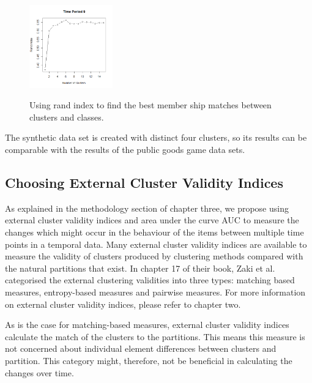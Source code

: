 \begin{figure}[!h]
{\begin{minipage}{\dimexpr \textwidth-2\fboxsep-2\fboxrule}
{                     \includegraphics[width=0.32\textwidth]{images/chapter4/elbowMemberShipAgreement9.png}    
                 }\\
             \end{minipage}}
             \caption{Using rand index to find the best member ship matches between clusters and classes.}
             \label{fig:elbowMemberShipAgreement}
         \end{figure}
         
 The synthetic data set is created with distinct four clusters, so its results can be comparable with the results of the public goods game data sets.
         
\subsection{Choosing External Cluster Validity Indices}
\label{sec:ChoosingExternalClusterValidityIndices}
         
As explained in the methodology section of chapter three, we propose using external cluster validity indices and area under the curve AUC to measure the changes which might occur in the behaviour of the items between multiple time points in a temporal data. Many external cluster validity indices are available \cite{Arbelaitz2012} to measure the validity of clusters produced by clustering methods compared with the natural partitions that exist. In chapter 17 of their book, Zaki et al. \cite{Zaki2014} categorised the external clustering validities into three types: matching based measures, entropy-based measures and pairwise measures. For more information on external cluster validity indices, please refer to chapter two.
         
As is the case for matching-based measures,  external cluster validity indices calculate the match of the clusters to the partitions. This means this measure is not concerned about individual element differences between clusters and partition.  This category might, therefore,  not be beneficial in calculating the changes over time.
         
